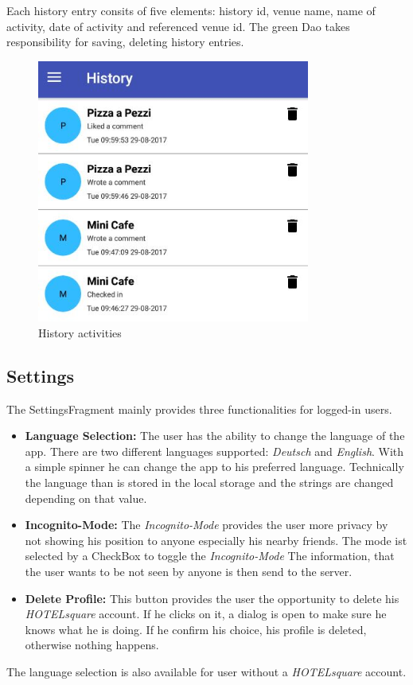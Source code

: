 Each history entry consits of five elements: history id, venue name, name  of activity, date of activity and referenced venue id. The green Dao takes responsibility for saving, deleting history entries. 
\begin{figure}[htbp]
	\includegraphics[width=0.8\textwidth]{images/history.jpg}
	\centering
	\caption[]{History activities}
	\label{fig:history}
\end{figure}
\subsection{Settings}
The SettingsFragment mainly provides three functionalities for logged-in users.

\begin{itemize}
\item \textbf{Language Selection:} The user has the ability to change the language of the app. There are two different languages supported: \textit{Deutsch} and \textit{English}. With a simple spinner he can change the app to his preferred language. Technically the language than is stored in the local storage and the strings are changed depending on that value.
\item \textbf{Incognito-Mode:} The \textit{Incognito-Mode} provides the user more privacy by not showing his position to anyone especially his nearby friends. The mode ist selected by a CheckBox to toggle the \textit{Incognito-Mode} The information, that the user wants to be not seen by anyone is then send to the server.
\item \textbf{Delete Profile:} This button provides the user the opportunity to delete his \textit{HOTELsquare} account. If he clicks on it, a dialog is open to make sure he knows what he is doing. If he confirm his choice, his profile is deleted, otherwise nothing happens.
\end{itemize}

The language selection is also available for user without a \textit{HOTELsquare} account.


